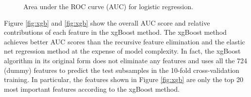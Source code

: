 \documentclass[10pt,a4paper]{article}
\begin{document}
\begin{figure}[b!]%
	\centering
	\qquad\qquad
	\caption{\protect \centering Area under the ROC curve (AUC) for logistic regression.\label{fig:auc}}
\end{figure}

Figure \ref{fig:xgb} and \ref{fig:xgb} show the overall AUC score and relative contributions of each feature in the xgBoost method. The xgBoost method achieves better AUC scores than the recursive feature elimination and the elastic net regression method at the expense of model complexity. In fact, the xgBoost algorithm in its original form does not eliminate any features and uses all the 724 (dummy) features to predict the test subsamples in the 10-fold cross-validation training. In particular, the features shown in Figure \ref{fig:xgb} are only the top 20 most important features according to the xgBoost method.
\end{document}
